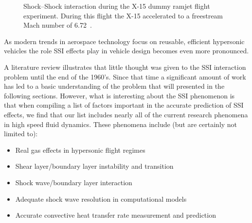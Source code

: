 \begin{figure}
\begin{center}
    \caption[Shock--Shock interaction during the X-15 dummy ramjet flight experiment.]{Shock--Shock interaction during the X-15 dummy ramjet flight experiment. During this flight the X-15 accelerated to a freestream Mach number of 6.72~\cite{x15_historical_perspective}.\label{fig:x15-ramjet}}
  \end{center}
\end{figure}
As modern trends in aerospace technology focus on reusable, efficient hypersonic vehicles the role SSI effects play in vehicle design becomes even more pronounced.

A literature review illustrates that little thought was given to the SSI interaction problem until the end of the 1960's.  Since that time a significant amount of work has led to a basic understanding of the problem that will presented in the following sections.  However, what is interesting about the SSI phenomenon is that when compiling a list of factors important in the accurate prediction of SSI effects, we find that our list includes nearly all of the current research phenomena in high speed fluid dynamics.  These phenomena include (but are certainly not limited to):
\begin{itemize}
  \tightlist
  \item Real gas effects in hypersonic flight regimes
  \item Shear layer/boundary layer instability and transition
  \item Shock wave/boundary layer interaction
  \item Adequate shock wave resolution in computational models
  \item Accurate convective heat transfer rate measurement and prediction
\end{itemize}

